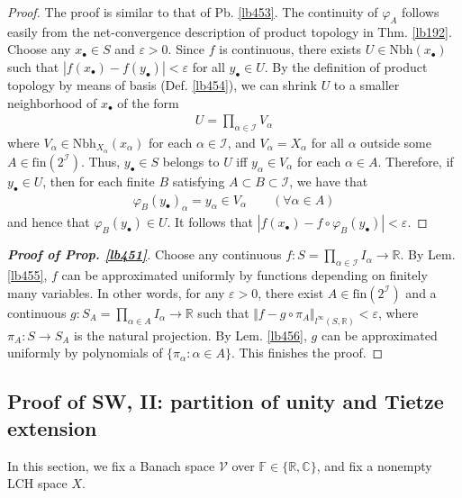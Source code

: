 \documentclass[12pt,b5paper,notitlepage]{article}
\theoremstyle{definition}
\theoremstyle{plain}
\newcommand{\mc}{\mathcal}
\newcommand{\scr}{\mathscr}
\newcommand{\blt}{\bullet}
\newcommand{\Cbb}{\mathbb C}
\newcommand{\Rbb}{\mathbb R}
\newcommand{\fin}{\mathrm{fin}}
\newcommand{\Fbb}{\mathbb F}
\newcommand{\Nbh}{\mathrm{Nbh}}
\newcommand{\eps}{\varepsilon}
\numberwithin{equation}{section}
\begin{document}
\begin{proof}
The proof is similar to that of Pb. \ref{lb453}. The continuity of $\varphi_A$ follows easily from the net-convergence description of product topology in Thm. \ref{lb192}. Choose any $x_\blt\in S$ and $\eps>0$. Since $f$ is continuous, there exists $U\in\Nbh(x_\blt)$ such that $|f(x_\blt)-f(y_\blt)|<\eps$ for all $y_\blt\in U$. By the definition of product topology by means of basis (Def. \ref{lb454}), we can shrink $U$ to a smaller neighborhood of $x_\blt$ of the form
\begin{align*}
U=\prod_{\alpha\in \scr I}V_\alpha
\end{align*}
where $V_\alpha\in\Nbh_{X_\alpha}(x_\alpha)$ for each $\alpha\in\scr I$, and $V_\alpha=X_\alpha$ for all $\alpha$ outside some $A\in\fin(2^{\scr I})$. Thus, $y_\blt\in S$ belongs to $U$ iff $y_\alpha\in V_\alpha$ for each $\alpha\in A$. Therefore, if $y_\blt\in U$, then for each finite $B$ satisfying $A\subset B\subset\scr I$, we have that
\begin{align*}
\varphi_B(y_\blt)_\alpha=y_\alpha\in V_\alpha\qquad(\forall\alpha\in A)
\end{align*}
and hence that $\varphi_B(y_\blt)\in U$. It follows that $|f(x_\blt)-f\circ\varphi_B(y_\blt)|<\eps$.
\end{proof}


\begin{proof}[\textbf{Proof of Prop. \ref{lb451}}]
Choose any continuous $f:S=\prod_{\alpha\in\scr I}I_\alpha\rightarrow\Rbb$. By Lem. \ref{lb455}, $f$ can be approximated uniformly by functions depending on finitely many variables. In other words, for any $\eps>0$, there exist $A\in\fin(2^{\scr I})$ and a continuous $g:S_A=\prod_{\alpha\in A}I_\alpha\rightarrow\Rbb$ such that $\Vert f-g\circ\pi_A\Vert_{l^\infty(S,\Rbb)}<\eps$, where $\pi_A:S\rightarrow S_A$ is the natural projection. By Lem. \ref{lb456}, $g$ can be approximated uniformly by polynomials of $\{\pi_\alpha:\alpha\in A\}$. This finishes the proof.
\end{proof}




\subsection{Proof of SW, II: partition of unity and Tietze extension}


In this section, we fix a Banach space $\mc V$ over $\Fbb\in\{\Rbb,\Cbb\}$, and fix a nonempty LCH space $X$.
\end{document}

